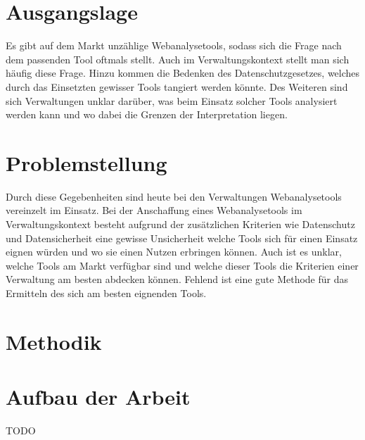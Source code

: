 
\section{Ausgangslage}
Es gibt auf dem Markt unzählige Webanalysetools, sodass sich die Frage nach dem passenden Tool oftmals stellt. Auch im Verwaltungskontext stellt man sich häufig diese Frage. Hinzu kommen die Bedenken des Datenschutzgesetzes, welches durch das Einsetzten gewisser Tools tangiert werden könnte. Des Weiteren sind sich Verwaltungen unklar darüber, was beim Einsatz solcher Tools analysiert werden kann und wo dabei die Grenzen der Interpretation liegen.

\section{Problemstellung}

Durch diese Gegebenheiten sind heute bei den Verwaltungen Webanalysetools vereinzelt im Einsatz. Bei der Anschaffung eines Webanalysetools im Verwaltungskontext besteht aufgrund der zusätzlichen Kriterien wie Datenschutz und Datensicherheit eine gewisse Unsicherheit welche Tools sich für einen Einsatz eignen würden und wo sie einen Nutzen erbringen können. Auch ist es unklar, welche Tools am Markt verfügbar sind und welche dieser Tools die Kriterien einer Verwaltung am besten abdecken können. Fehlend ist eine gute Methode für das Ermitteln des sich am besten eignenden Tools.

\section{Methodik}


\section{Aufbau der Arbeit}

TODO